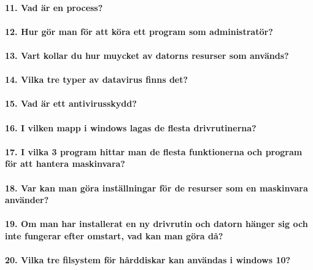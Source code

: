 \paragraph{11. Vad är en process?}

\paragraph{12. Hur gör man för att köra ett program som administratör?}

\paragraph{13. Vart kollar du hur muycket av datorns resurser som används?}

\paragraph{14. Vilka tre typer av datavirus finns det?}

\paragraph{15. Vad är ett antivirusskydd?}

\paragraph{16. I vilken mapp i windows lagas de flesta drivrutinerna?}

\paragraph{17. I vilka 3 program hittar man de flesta funktionerna och program för att hantera maskinvara?}

\paragraph{18. Var kan man göra inställningar för de resurser som en maskinvara använder?}

\paragraph{19. Om man har installerat en ny drivrutin och datorn hänger sig och inte fungerar efter omstart, vad kan man göra då?}

\paragraph{20. Vilka tre filsystem för hårddiskar kan användas i windows 10?}

